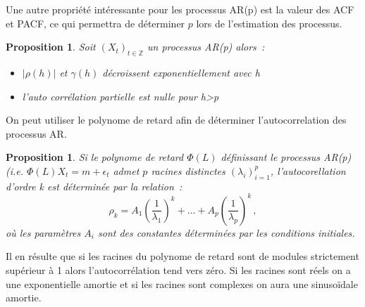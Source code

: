 \documentclass[11pt]{scrartcl} %
\newtheorem{pro}[theorem]{Proposition}
\newcommand{\Xt}{\left(X_t\right)_{t\in\mathbb{Z}}}
\begin{document}
Une autre propriété intéressante pour les processus AR(p) est la valeur des ACF et PACF, ce qui permettra de déterminer $p$ lors de l'estimation des processus.
\begin{pro}
Soit $\Xt$ un processus AR(p) alors~:
\begin{itemize}
\item[i)] $|\rho(h)|$ et $\gamma(h)$ décroissent exponentiellement avec h\\
\item[ii)] l'auto corrélation partielle est nulle pour h>p
\end{itemize}
\end{pro}
On peut utiliser le polynome de retard afin de déterminer l'autocorrelation des processus AR.
\begin{pro}
Si le polynome de retard $\Phi(L)$ définissant le processus AR(p) (i.e. $\Phi(L)X_t=m+\epsilon_t$ admet $p$ racines distinctes $(\lambda_i)^p_{i=1}$, l'autocorellation d'ordre k est déterminée par la relation~:
$$
\rho_k = A_1\left(\frac{1}{\lambda_1}\right)^k+...+A_p\left(\frac{1}{\lambda_p}\right)^k\,,
$$
où les paramètres $A_i$ sont des constantes déterminées par les conditions initiales.
\end{pro}
Il en résulte que si les racines du  polynome de retard sont de modules strictement supérieur à 1 alors l'autocorrélation tend vers zéro. Si les racines sont réels on a une exponentielle amortie et si les racines sont complexes on aura une sinusoïdale amortie.
\end{document}
